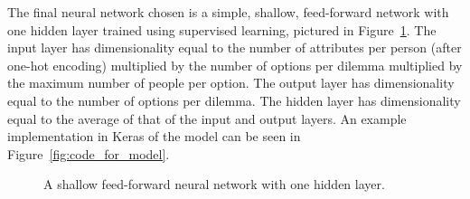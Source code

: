 \documentclass[paper=a4paper]{report}
\begin{document}
The final neural network chosen is a simple, shallow, feed-forward network with one hidden layer
trained using supervised learning, pictured in Figure~\ref{fig:shallow_neural_network}. The input
layer has dimensionality equal to the number of attributes per person (after one-hot encoding)
multiplied by the number of options per dilemma multiplied by the maximum number of people per
option. The output layer has dimensionality equal to the number of options per dilemma. The hidden
layer has dimensionality equal to the average of that of the input and output layers. An example
implementation in Keras of the model can be seen in Figure~\ref{fig:code_for_model}.

\begin{figure}[h]
    \centering
    
    
    \caption[]{A shallow feed-forward neural network with one hidden layer.}
    \label{fig:shallow_neural_network}
\end{figure}
\end{document}
